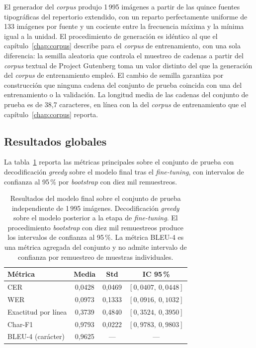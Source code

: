 El generador del \textit{corpus} produjo 1\,995 imágenes a partir de las quince fuentes tipográficas del repertorio extendido, con un reparto perfectamente uniforme de 133 imágenes por fuente y un cociente entre la frecuencia máxima y la mínima igual a la unidad. El procedimiento de generación es idéntico al que el capítulo~\ref{chap:corpus} describe para el \textit{corpus} de entrenamiento, con una sola diferencia: la semilla aleatoria que controla el muestreo de cadenas a partir del \textit{corpus} textual de Project Gutenberg toma un valor distinto del que la generación del \textit{corpus} de entrenamiento empleó. El cambio de semilla garantiza por construcción que ninguna cadena del conjunto de prueba coincida con una del entrenamiento o la validación. La longitud media de las cadenas del conjunto de prueba es de 38,7 caracteres, en línea con la del \textit{corpus} de entrenamiento que el capítulo~\ref{chap:corpus} reporta.

\subsection{Resultados globales}
\label{subsec:test-global}

La tabla~\ref{tab:test-global} reporta las métricas principales sobre el conjunto de prueba con decodificación \textit{greedy} sobre el modelo final tras el \textit{fine-tuning}, con intervalos de confianza al 95\,\% por \textit{bootstrap} con diez mil remuestreos.

\begin{table}[!htbp]
	\centering
	\caption{Resultados del modelo final sobre el conjunto de prueba independiente de 1\,995 imágenes. Decodificación \textit{greedy} sobre el modelo posterior a la etapa de \textit{fine-tuning}. El procedimiento \textit{bootstrap} con diez mil remuestreos produce los intervalos de confianza al 95\,\%. La métrica BLEU-4 es una métrica agregada del conjunto y no admite intervalo de confianza por remuestreo de muestras individuales.}
	\label{tab:test-global}
	\begin{tabular}{lccc}
		\toprule
		\textbf{Métrica}     & \textbf{Media} & \textbf{Std} & \textbf{IC 95\,\%} \\
		\midrule
		CER                  & 0,0428 & 0,0469 & $[0{,}0407,\ 0{,}0448]$ \\
		WER                  & 0,0973 & 0,1333 & $[0{,}0916,\ 0{,}1032]$ \\
		Exactitud por línea  & 0,3739 & 0,4840 & $[0{,}3524,\ 0{,}3950]$ \\
		Char-F1              & 0,9793 & 0,0222 & $[0{,}9783,\ 0{,}9803]$ \\
		BLEU-4 (carácter)    & 0,9625 & ---    & --- \\
		\bottomrule
	\end{tabular}
\end{table}

